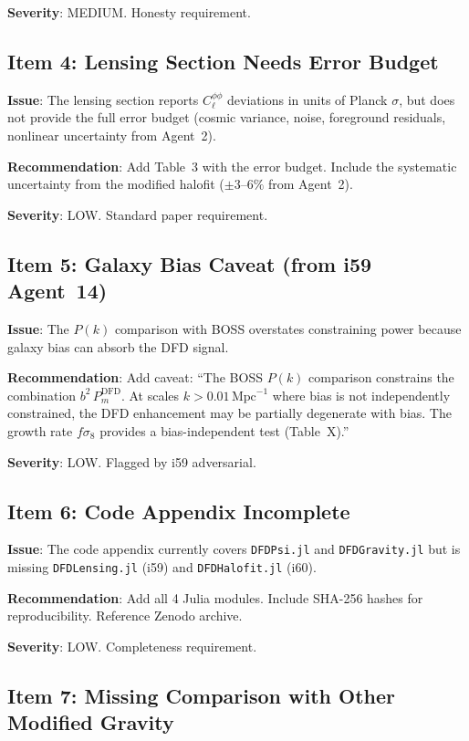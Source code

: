 \documentclass[11pt,a4paper]{article}
\begin{document}
\textbf{Severity}: MEDIUM. Honesty requirement.

\subsection{Item 4: Lensing Section Needs Error Budget}

\textbf{Issue}: The lensing section reports $C_\ell^{\phi\phi}$ deviations in units of Planck $\sigma$, but does not provide the full error budget (cosmic variance, noise, foreground residuals, nonlinear uncertainty from Agent~2).

\textbf{Recommendation}: Add Table~3 with the error budget. Include the systematic uncertainty from the modified halofit ($\pm 3$--$6\%$ from Agent~2).

\textbf{Severity}: LOW. Standard paper requirement.

\subsection{Item 5: Galaxy Bias Caveat (from i59 Agent~14)}

\textbf{Issue}: The $P(k)$ comparison with BOSS overstates constraining power because galaxy bias can absorb the DFD signal.

\textbf{Recommendation}: Add caveat: ``The BOSS $P(k)$ comparison constrains the combination $b^2\,P_m^{\mathrm{DFD}}$. At scales $k > 0.01\,\mathrm{Mpc}^{-1}$ where bias is not independently constrained, the DFD enhancement may be partially degenerate with bias. The growth rate $f\sigma_8$ provides a bias-independent test (Table~X).''

\textbf{Severity}: LOW. Flagged by i59 adversarial.

\subsection{Item 6: Code Appendix Incomplete}

\textbf{Issue}: The code appendix currently covers \texttt{DFDPsi.jl} and \texttt{DFDGravity.jl} but is missing \texttt{DFDLensing.jl} (i59) and \texttt{DFDHalofit.jl} (i60).

\textbf{Recommendation}: Add all 4 Julia modules. Include SHA-256 hashes for reproducibility. Reference Zenodo archive.

\textbf{Severity}: LOW. Completeness requirement.

\subsection{Item 7: Missing Comparison with Other Modified Gravity}
\end{document}
